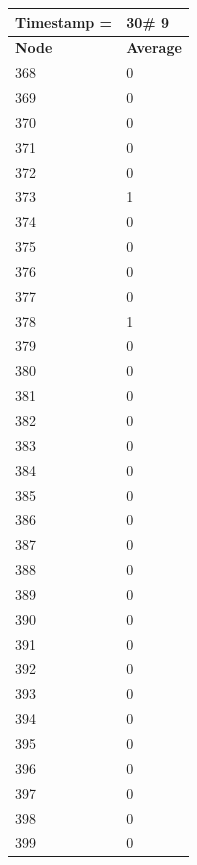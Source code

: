 \begin{tabular}{|l||l|}
\hline
\textbf{Timestamp =} & \textbf{30}\# 9\\\hline
	\textbf{Node} & \textbf{Average} \\ \hline
\hline
	368 & 0 \\ \hline
	369 & 0 \\ \hline
	370 & 0 \\ \hline
	371 & 0 \\ \hline
	372 & 0 \\ \hline
	373 & 1 \\ \hline
	374 & 0 \\ \hline
	375 & 0 \\ \hline
	376 & 0 \\ \hline
	377 & 0 \\ \hline
	378 & 1 \\ \hline
	379 & 0 \\ \hline
	380 & 0 \\ \hline
	381 & 0 \\ \hline
	382 & 0 \\ \hline
	383 & 0 \\ \hline
	384 & 0 \\ \hline
	385 & 0 \\ \hline
	386 & 0 \\ \hline
	387 & 0 \\ \hline
	388 & 0 \\ \hline
	389 & 0 \\ \hline
	390 & 0 \\ \hline
	391 & 0 \\ \hline
	392 & 0 \\ \hline
	393 & 0 \\ \hline
	394 & 0 \\ \hline
	395 & 0 \\ \hline
	396 & 0 \\ \hline
	397 & 0 \\ \hline
	398 & 0 \\ \hline
	399 & 0 \\ \hline
\end{tabular}

